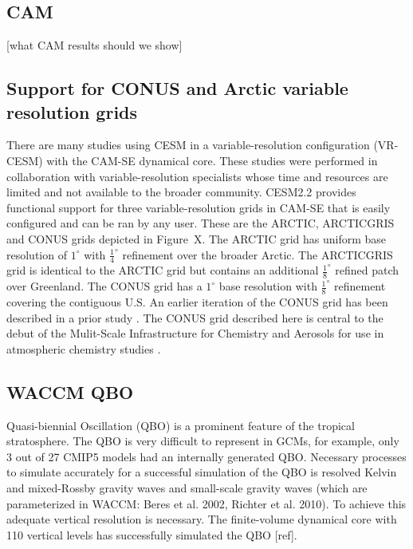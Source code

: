 \documentclass[draft]{agujournal2019}
\begin{document}
\subsection{CAM}
[what CAM results should we show]
\subsection{Support for CONUS and Arctic variable resolution grids}
There are many studies using CESM in a variable-resolution configuration (VR-CESM) with the CAM-SE dynamical core. These studies were performed in collaboration with variable-resolution specialists whose time and resources are limited and not available to the broader community. CESM2.2 provides functional support for three variable-resolution grids in CAM-SE that is easily configured and can be ran by any user. These are the ARCTIC, ARCTICGRIS and CONUS grids depicted in Figure~X. The ARCTIC grid has uniform base resolution of $1^{\circ}$ with $\frac{1}{4}^{\circ}$ refinement over the broader Arctic. The ARCTICGRIS grid is identical to the ARCTIC grid but contains an additional $\frac{1}{8}^{\circ}$ refined patch over Greenland. The CONUS grid has a $1^{\circ}$ base resolution with $\frac{1}{8}^{\circ}$ refinement covering the contiguous U.S. An earlier iteration of the CONUS grid has been described in a prior study \cite{GetAl2017JAMES}. The CONUS grid described here is central to the debut of the Mulit-Scale Infrastructure for Chemistry and Aerosols for use in atmospheric chemistry studies \cite{MUSICA2020}.

\subsection{WACCM QBO}
Quasi-biennial Oscillation (QBO) is a prominent feature of the tropical stratosphere. The QBO is very difficult to represent in GCMs, for example, only 3 out of 27 CMIP5 models had an internally generated QBO. Necessary processes to simulate accurately for a successful simulation of the QBO is resolved Kelvin and mixed-Rossby gravity waves and small-scale gravity waves (which are parameterized in WACCM: Beres et al. 2002, Richter et al. 2010). To achieve this adequate vertical resolution is necessary. The finite-volume dynamical core with 110 vertical levels has successfully simulated the QBO [ref].
\end{document}
